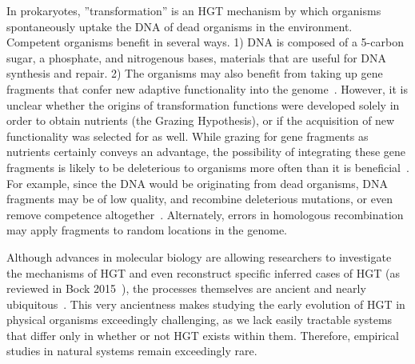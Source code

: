 \documentclass[PhD]{msu-thesis}
\begin{document}
In prokaryotes, ''transformation'' is an HGT mechanism by which organisms spontaneously uptake the DNA of dead organisms in the environment. Competent organisms benefit in several ways. 1) DNA is composed of a 5-carbon sugar, a phosphate, and nitrogenous bases, materials that are useful for DNA synthesis and repair. 2) The organisms may also benefit from taking up
gene fragments that confer new adaptive functionality into the genome~\cite{vos_why_2009}. However, it is unclear whether the origins of transformation functions were developed solely in order to obtain nutrients (the Grazing Hypothesis), or if the acquisition of new functionality was selected for as well. While grazing for gene fragments as nutrients certainly conveys an advantage, the possibility of integrating these gene fragments is likely to be deleterious to organisms more often than it is beneficial~\cite{redfield_evolution_1997}. For example, since the DNA would be originating from dead organisms, DNA fragments may be of low quality, and recombine deleterious mutations, or even remove competence altogether~\cite{redfield_evolution_1997}. Alternately, errors in homologous recombination may apply fragments to random locations in the genome.    

Although advances in molecular biology are allowing researchers to investigate the mechanisms of HGT and even reconstruct specific inferred cases of HGT (as reviewed in Bock 2015~\cite{bock_witnessing_2015}), the processes themselves are ancient and nearly ubiquitous~\cite{soucy_horizontal_2015}. This very ancientness makes studying the early evolution of HGT in physical organisms exceedingly challenging, as we lack easily tractable systems that differ only in whether or not HGT exists within them. Therefore, empirical studies in natural systems remain exceedingly rare.
\end{document}

